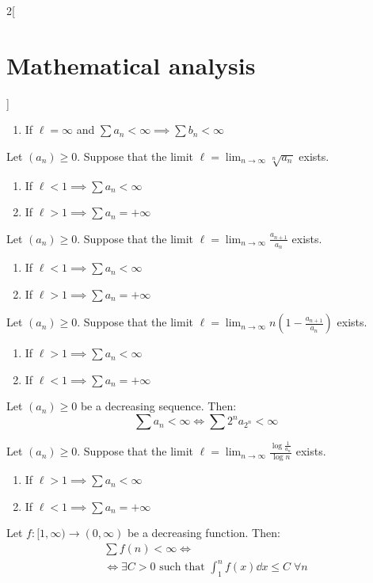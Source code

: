 \documentclass[../../../main.tex]{subfiles}
\begin{document}
\begin{multicols}{2}[\section{Mathematical analysis}]
\begin{theorem}
\begin{enumerate}
      \item If $\ell=\infty$ and $\sum a_n<\infty\implies\sum b_n<\infty$
    \end{enumerate}
  \end{theorem}
  \begin{theorem}
    Let $(a_n)\geq 0$. Suppose that the limit $\displaystyle \ell=\lim_{n\to\infty}\sqrt[n]{a_n}$ exists.
    \begin{enumerate}
      \item If $\ell<1\implies\sum a_n<\infty$
      \item If $\ell>1\implies\sum a_n=+\infty$
    \end{enumerate}
  \end{theorem}
  \begin{theorem}
    Let $(a_n)\geq 0$. Suppose that the limit $\displaystyle \ell=\lim_{n\to\infty}\frac{a_{n+1}}{a_n}$ exists.
    \begin{enumerate}
      \item If $\ell<1\implies\sum a_n<\infty$
      \item If $\ell>1\implies\sum a_n=+\infty$
    \end{enumerate}
  \end{theorem}
  \begin{theorem}
    Let $(a_n)\geq 0$. Suppose that the limit $\displaystyle \ell=\lim_{n\to\infty}n\left(1-\frac{a_{n+1}}{a_n}\right)$ exists.
    \begin{enumerate}
      \item If $\ell>1\implies\sum a_n<\infty$
      \item If $\ell<1\implies\sum a_n=+\infty$
    \end{enumerate}
  \end{theorem}
  \begin{theorem}
    Let $(a_n)\geq 0$ be a decreasing sequence. Then: $$\textstyle\sum a_n<\infty\iff\sum 2^na_{2^n}<\infty$$
  \end{theorem}
  \begin{theorem}
    Let $(a_n)\geq 0$. Suppose that the limit $\displaystyle \ell=\lim_{n\to\infty}\frac{\log\frac{1}{a_n}}{\log n}$ exists.
    \begin{enumerate}
      \item If $\ell>1\implies\sum a_n<\infty$
      \item If $\ell<1\implies\sum a_n=+\infty$
    \end{enumerate}
  \end{theorem}
  \begin{theorem}\label{MA_inttest}
    Let $f:[1,\infty)\rightarrow(0,\infty)$ be a decreasing function. Then:
    \begin{multline*}
      \textstyle\sum f(n)<\infty\iff\\ \displaystyle\iff\exists C>0\text{ such that }\int_1^nf(x)\dd{x}\leq C\;\forall n
    \end{multline*}
  \end{theorem}

\end{multicols}
\end{document}
